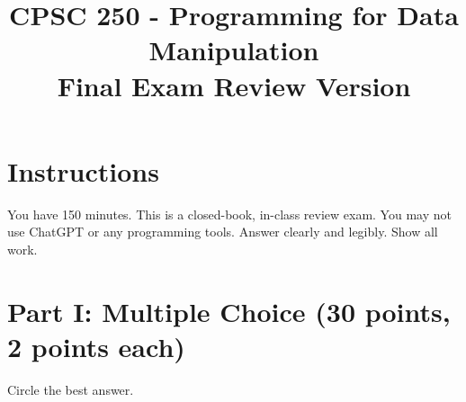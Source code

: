 \documentclass[12pt]{article}
\title{CPSC 250 - Programming for Data Manipulation\\Final Exam Review Version}
\date{}
\begin{document}
\maketitle

\section*{Instructions}
You have 150 minutes. This is a closed-book, in-class review exam. You may not use ChatGPT or any programming tools. Answer clearly and legibly. Show all work.

\section*{Part I: Multiple Choice (30 points, 2 points each)}
Circle the best answer.
\end{document}
